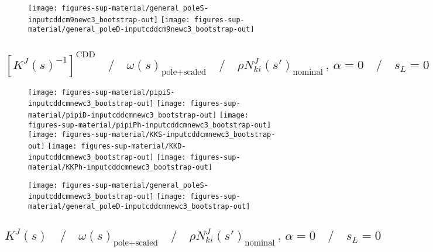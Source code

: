 \begin{figure}[h]
\centering\texttt{[image: figures-sup-material/general\_poleS-inputcddcm9newc3\_bootstrap-out]} \texttt{[image: figures-sup-material/general\_poleD-inputcddcm9newc3\_bootstrap-out]}
\end{figure}



\clearpage

\subsection{$\left[K^J(s)^{-1}\right]^\text{CDD} \quad\Big/\quad \omega(s)_\text{pole+scaled} \quad\Big/\quad \rho N^J_{ki}(s')_\text{nominal}\,,\,\alpha = 0  \quad\Big/\quad s_L = 0$}
\label{subsec:inputcddcmnewc3_bootstrap-out}






\begin{figure}[h]
\centering\texttt{[image: figures-sup-material/pipiS-inputcddcmnewc3\_bootstrap-out]} \texttt{[image: figures-sup-material/pipiD-inputcddcmnewc3\_bootstrap-out]} \texttt{[image: figures-sup-material/pipiPh-inputcddcmnewc3\_bootstrap-out]}
\texttt{[image: figures-sup-material/KKS-inputcddcmnewc3\_bootstrap-out]} \texttt{[image: figures-sup-material/KKD-inputcddcmnewc3\_bootstrap-out]} \texttt{[image: figures-sup-material/KKPh-inputcddcmnewc3\_bootstrap-out]}
\end{figure}

\begin{figure}[h]
\centering\texttt{[image: figures-sup-material/general\_poleS-inputcddcmnewc3\_bootstrap-out]} \texttt{[image: figures-sup-material/general\_poleD-inputcddcmnewc3\_bootstrap-out]}
\end{figure}



\clearpage

\subsection{$K^J(s) \quad\Big/\quad \omega(s)_\text{pole+scaled} \quad\Big/\quad \rho N^J_{ki}(s')_\text{nominal}\,,\,\alpha = 0  \quad\Big/\quad s_L = 0$}
\label{subsec:inputstartcm11new2c3_bootstrap-out}


